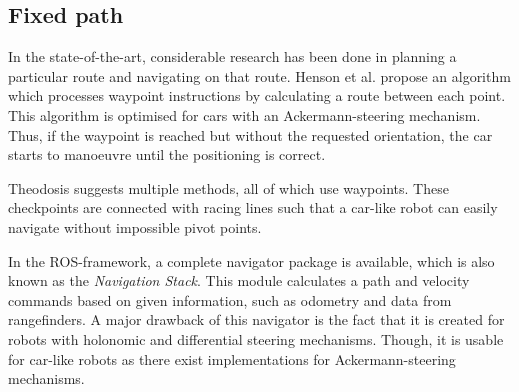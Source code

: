 \documentclass[conference,a4paper]{IEEEtran}
\begin{document}
\subsection{Fixed path}



In the state-of-the-art, considerable research has been done in planning a particular route and navigating on that route. Henson et al. \cite{Henson2008} propose an algorithm which processes waypoint instructions by calculating a route between each point. This algorithm is optimised for cars with an Ackermann-steering mechanism. Thus, if the waypoint is reached but without the requested orientation, the car starts to manoeuvre until the positioning is correct. 

Theodosis \cite{Theodosis2014} suggests multiple methods, all of which use waypoints. These checkpoints are connected with racing lines such that a car-like robot can easily navigate without impossible pivot points. 

In the ROS-framework, a complete navigator package is available, which is also known as the \emph{Navigation Stack}. This module calculates a path and velocity commands based on given information, such as odometry and data from rangefinders. A major drawback of this navigator is the fact that it is created for robots with holonomic and differential steering mechanisms. Though, it is usable for car-like robots as there exist implementations for Ackermann-steering mechanisms.
\end{document}
